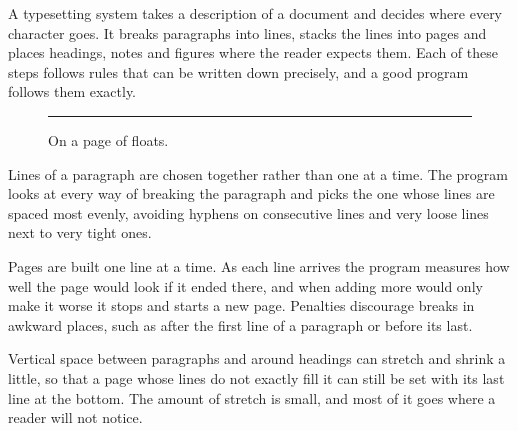 \documentclass{article}
\begin{document}
A typesetting system takes a description of a document and decides where every character goes. It breaks paragraphs into lines, stacks the lines into pages and places headings, notes and figures where the reader expects them. Each of these steps follows rules that can be written down precisely, and a good program follows them exactly.
\begin{figure}[p]
\centering
\rule{4cm}{10cm}
\caption{On a page of floats.}
\end{figure}
Lines of a paragraph are chosen together rather than one at a time. The program looks at every way of breaking the paragraph and picks the one whose lines are spaced most evenly, avoiding hyphens on consecutive lines and very loose lines next to very tight ones.

Pages are built one line at a time. As each line arrives the program measures how well the page would look if it ended there, and when adding more would only make it worse it stops and starts a new page. Penalties discourage breaks in awkward places, such as after the first line of a paragraph or before its last.

Vertical space between paragraphs and around headings can stretch and shrink a little, so that a page whose lines do not exactly fill it can still be set with its last line at the bottom. The amount of stretch is small, and most of it goes where a reader will not notice.
\end{document}
